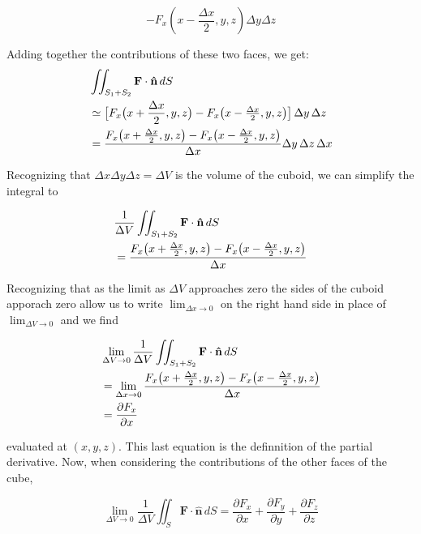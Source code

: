 \documentclass[11pt]{article}
\begin{document}
\begin{equation}
	- F_x (x - \frac{\Delta x}{2}, y, z) \Delta y \Delta z
\end{equation}

Adding together the contributions of these two faces, we get:
\begin{align}
	&\iint_{S_1 + S_2} \mathbf F \cdot \mathbf{\hat{n}} \, dS \notag\\
	&\simeq \bigl [F_x \bigl(x + \frac{\Delta x}{2},y,z \bigr) - F_x \bigl(x - \tfrac{\Delta x}{2},y,z \bigr) \bigr] \, \Delta y\,\Delta z \\
	&= \frac{F_x\bigl(x + \tfrac{\Delta x}{2},y,z\bigr) - F_x\bigl(x - \tfrac{\Delta x}{2},y,z \bigr)}{\Delta x} \Delta y\,\Delta z\,\Delta x \notag
\end{align}

Recognizing that $\Delta x \Delta y \Delta z = \Delta V$ is the volume of the cuboid, we can simplify the integral to

\begin{align}
	&\frac{1}{\Delta V} \iint_{S_1 + S_2} \mathbf F \cdot \mathbf{\hat{n}} \, dS \notag\\
	&= \frac{F_x\bigl(x + \tfrac{\Delta x}{2},y,z\bigr) - F_x\bigl(x - \tfrac{\Delta x}{2},y,z \bigr)}{\Delta x}
\end{align}

Recognizing that as the limit as $\Delta V$ approaches zero the sides of the cuboid apporach zero allow us to write $\lim_{\Delta x \rightarrow 0}$ on the right hand side in place of $\lim_{\Delta V \rightarrow 0}$ and we find

\begin{align}
	&\lim_{\Delta V \rightarrow 0} \frac{1}{\Delta V} \iint_{S_1 + S_2} \mathbf F \cdot \mathbf{\hat{n}} \, dS \notag\\
	& = \lim_{\Delta x \rightarrow 0} \frac{F_x\bigl(x + \tfrac{\Delta x}{2},y,z\bigr) - F_x\bigl(x - \tfrac{\Delta x}{2},y,z \bigr)}{\Delta x}	\\
	&= \frac{\partial F_x}{\partial x}
\end{align}

evaluated at $(x,y,z)$. This last equation is the definnition of the partial derivative. Now, when considering the contributions of the other faces of the cube,

\begin{equation}
	\lim_{\Delta V \rightarrow 0} \frac{1} {\Delta V} \iint_S \mathbf{F} \cdot \mathbf{\hat{n}} \, dS = \frac{\partial F_x}{\partial x} + \frac{\partial F_y}{\partial y} + \frac{\partial F_z}{\partial z}
\end{equation}
\end{document}
